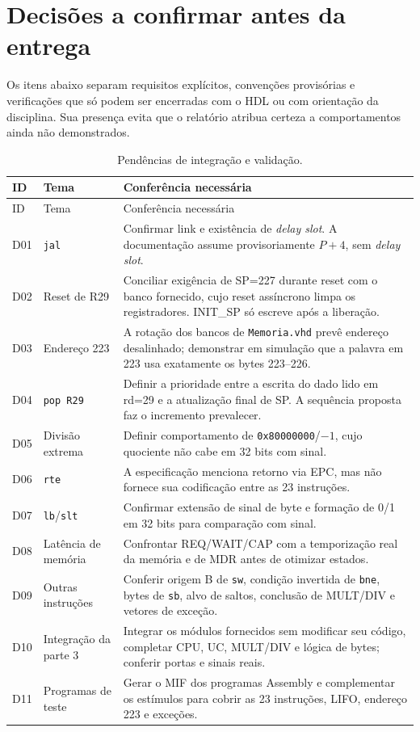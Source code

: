 \section{Decisões a confirmar antes da entrega}\label{ap:pendencias}

Os itens abaixo separam requisitos explícitos, convenções provisórias e verificações que só podem ser encerradas com o HDL ou com orientação da disciplina. Sua presença evita que o relatório atribua certeza a comportamentos ainda não demonstrados.

\begin{longtable}{@{}p{1.1cm}p{3.1cm}p{10.3cm}@{}}
\caption{Pendências de integração e validação.}\label{tab:pendencias}\\
\toprule ID & Tema & Conferência necessária \\\midrule
\endfirsthead
\toprule ID & Tema & Conferência necessária \\\midrule
\endhead
\bottomrule
\endfoot
D01 & \texttt{jal} & Confirmar link e existência de \emph{delay slot}. A documentação assume provisoriamente $P+4$, sem \emph{delay slot}. \\
D02 & Reset de R29 & Conciliar exigência de SP=227 durante reset com o banco fornecido, cujo reset assíncrono limpa os registradores. INIT\_SP só escreve após a liberação. \\
D03 & Endereço 223 & A rotação dos bancos de \texttt{Memoria.vhd} prevê endereço desalinhado; demonstrar em simulação que a palavra em 223 usa exatamente os bytes 223--226. \\
D04 & \texttt{pop R29} & Definir a prioridade entre a escrita do dado lido em rd=29 e a atualização final de SP. A sequência proposta faz o incremento prevalecer. \\
D05 & Divisão extrema & Definir comportamento de \texttt{0x80000000}/$-1$, cujo quociente não cabe em 32 bits com sinal. \\
D06 & \texttt{rte} & A especificação menciona retorno via EPC, mas não fornece sua codificação entre as 23 instruções. \\
D07 & \texttt{lb}/\texttt{slt} & Confirmar extensão de sinal de byte e formação de 0/1 em 32 bits para comparação com sinal. \\
D08 & Latência de memória & Confrontar REQ/WAIT/CAP com a temporização real da memória e de MDR antes de otimizar estados. \\
D09 & Outras instruções & Conferir origem B de \texttt{sw}, condição invertida de \texttt{bne}, bytes de \texttt{sb}, alvo de saltos, conclusão de MULT/DIV e vetores de exceção. \\
D10 & Integração da parte 3 & Integrar os módulos fornecidos sem modificar seu código, completar CPU, UC, MULT/DIV e lógica de bytes; conferir portas e sinais reais. \\
D11 & Programas de teste & Gerar o MIF dos programas Assembly e complementar os estímulos para cobrir as 23 instruções, LIFO, endereço 223 e exceções. \\
\end{longtable}
